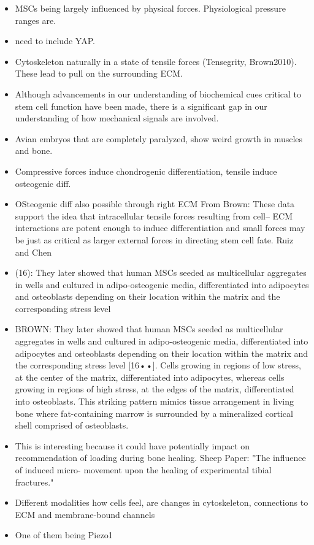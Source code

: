 \begin{itemize}
	\item MSCs being largely influenced by physical forces. Physiological pressure ranges are.
	\item need to include YAP. 
	\item Cytoskeleton naturally in a state of tensile forces (Tensegrity, Brown2010). These lead to pull on the surrounding ECM. 
	\item Although advancements in our understanding of biochemical cues critical to stem cell function have been made, there is a significant gap in our understanding of how mechanical signals are involved.
	\item Avian embryos that are completely paralyzed, show weird growth in muscles and bone.
	\item Compressive forces induce chondrogenic differentiation, tensile induce osteogenic diff.
	\item OSteogenic diff also possible through right ECM From Brown: These data support the idea that intracellular tensile forces resulting from cell– ECM interactions are potent enough to induce differentiation and small forces may be just as critical as larger external forces in directing stem cell fate. Ruiz and Chen
	\item (16): They later showed that human MSCs seeded as multicellular aggregates in wells and cultured in adipo-osteogenic media, differentiated into adipocytes and osteoblasts depending on their location within the matrix and the corresponding stress level	
	\item BROWN: They later showed that human MSCs seeded as multicellular aggregates in wells and cultured in adipo-osteogenic media, differentiated into adipocytes and osteoblasts depending on their location within the matrix and the corresponding stress level [16••]. Cells growing in regions of low stress, at the center of the matrix, differentiated into adipocytes, whereas cells growing in regions of high stress, at the edges of the matrix, differentiated into osteoblasts. This striking pattern mimics tissue arrangement in living bone where fat-containing marrow is surrounded by a mineralized cortical shell comprised of osteoblasts. 
	\item This is interesting because it could have potentially impact on recommendation of loading during bone healing. Sheep Paper: "The influence of induced micro- movement upon the healing of experimental tibial fractures."
	\item Different modalities how cells feel, are changes in cytoskeleton, connections to ECM and membrane-bound channels
	\item One of them being Piezo1	
	
	
\end{itemize}

